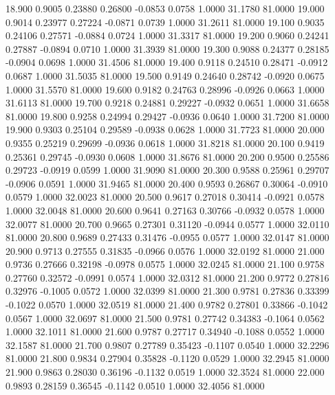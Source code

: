   18.900   0.9005   0.23880   0.26800  -0.0853   0.0758   1.0000  31.1780  81.0000
  19.000   0.9014   0.23977   0.27224  -0.0871   0.0739   1.0000  31.2611  81.0000
  19.100   0.9035   0.24106   0.27571  -0.0884   0.0724   1.0000  31.3317  81.0000
  19.200   0.9060   0.24241   0.27887  -0.0894   0.0710   1.0000  31.3939  81.0000
  19.300   0.9088   0.24377   0.28185  -0.0904   0.0698   1.0000  31.4506  81.0000
  19.400   0.9118   0.24510   0.28471  -0.0912   0.0687   1.0000  31.5035  81.0000
  19.500   0.9149   0.24640   0.28742  -0.0920   0.0675   1.0000  31.5570  81.0000
  19.600   0.9182   0.24763   0.28996  -0.0926   0.0663   1.0000  31.6113  81.0000
  19.700   0.9218   0.24881   0.29227  -0.0932   0.0651   1.0000  31.6658  81.0000
  19.800   0.9258   0.24994   0.29427  -0.0936   0.0640   1.0000  31.7200  81.0000
  19.900   0.9303   0.25104   0.29589  -0.0938   0.0628   1.0000  31.7723  81.0000
  20.000   0.9355   0.25219   0.29699  -0.0936   0.0618   1.0000  31.8218  81.0000
  20.100   0.9419   0.25361   0.29745  -0.0930   0.0608   1.0000  31.8676  81.0000
  20.200   0.9500   0.25586   0.29723  -0.0919   0.0599   1.0000  31.9090  81.0000
  20.300   0.9588   0.25961   0.29707  -0.0906   0.0591   1.0000  31.9465  81.0000
  20.400   0.9593   0.26867   0.30064  -0.0910   0.0579   1.0000  32.0023  81.0000
  20.500   0.9617   0.27018   0.30414  -0.0921   0.0578   1.0000  32.0048  81.0000
  20.600   0.9641   0.27163   0.30766  -0.0932   0.0578   1.0000  32.0077  81.0000
  20.700   0.9665   0.27301   0.31120  -0.0944   0.0577   1.0000  32.0110  81.0000
  20.800   0.9689   0.27433   0.31476  -0.0955   0.0577   1.0000  32.0147  81.0000
  20.900   0.9713   0.27555   0.31835  -0.0966   0.0576   1.0000  32.0192  81.0000
  21.000   0.9736   0.27666   0.32198  -0.0978   0.0575   1.0000  32.0245  81.0000
  21.100   0.9758   0.27760   0.32572  -0.0991   0.0574   1.0000  32.0312  81.0000
  21.200   0.9772   0.27816   0.32976  -0.1005   0.0572   1.0000  32.0399  81.0000
  21.300   0.9781   0.27836   0.33399  -0.1022   0.0570   1.0000  32.0519  81.0000
  21.400   0.9782   0.27801   0.33866  -0.1042   0.0567   1.0000  32.0697  81.0000
  21.500   0.9781   0.27742   0.34383  -0.1064   0.0562   1.0000  32.1011  81.0000
  21.600   0.9787   0.27717   0.34940  -0.1088   0.0552   1.0000  32.1587  81.0000
  21.700   0.9807   0.27789   0.35423  -0.1107   0.0540   1.0000  32.2296  81.0000
  21.800   0.9834   0.27904   0.35828  -0.1120   0.0529   1.0000  32.2945  81.0000
  21.900   0.9863   0.28030   0.36196  -0.1132   0.0519   1.0000  32.3524  81.0000
  22.000   0.9893   0.28159   0.36545  -0.1142   0.0510   1.0000  32.4056  81.0000

